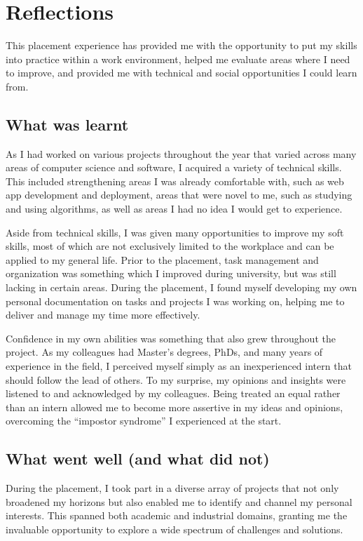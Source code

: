 \chapter{Reflections}

This placement experience has provided me with the opportunity to put my skills into practice within
a work environment, helped me evaluate areas where I need to improve, and provided me with technical
and social opportunities I could learn from.

\section{What was learnt}

As I had worked on various projects throughout the year that varied across many areas of computer
science and software, I acquired a variety of technical skills. This included strengthening areas I
was already comfortable with, such as web app development and deployment, areas that were novel to
me, such as studying and using  algorithms, as well as areas I had no idea I would get to
experience.

Aside from technical skills, I was given many opportunities to improve my soft skills, most of which
are not exclusively limited to the workplace and can be applied to my general life. Prior to the
placement, task management and organization was something which I improved during university, but
was still lacking in certain areas. During the placement, I found myself developing my own personal
documentation on tasks and projects I was working on, helping me to deliver and manage my time more
effectively.

Confidence in my own abilities was something that also grew throughout the project. As my colleagues
had Master's degrees, PhDs, and many years of experience in the field, I perceived myself simply as
an inexperienced intern that should follow the lead of others. To my surprise, my opinions and
insights were listened to and acknowledged by my colleagues. Being treated an equal rather than an
intern allowed me to become more assertive in my ideas and opinions, overcoming the
\enquote{impostor syndrome} I experienced at the start.

\section{What went well (and what did not)}

During the placement, I took part in a diverse array of projects that not only broadened my horizons
but also enabled me to identify and channel my personal interests. This spanned both academic and
industrial domains, granting me the invaluable opportunity to explore a wide spectrum of challenges
and solutions.


